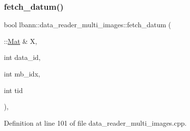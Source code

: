 \subsubsection{\texorpdfstring{fetch\+\_\+datum()}{fetch\_datum()}}
{\footnotesize\ttfamily bool lbann\+::data\+\_\+reader\+\_\+multi\+\_\+images\+::fetch\+\_\+datum (\begin{DoxyParamCaption}\item[{\+::\hyperlink{base_8hpp_a68f11fdc31b62516cb310831bbe54d73}{Mat} \&}]{X,  }\item[{int}]{data\+\_\+id,  }\item[{int}]{mb\+\_\+idx,  }\item[{int}]{tid }\end{DoxyParamCaption})\hspace{0.3cm}{\ttfamily [override]}, {\ttfamily [protected]}}



Definition at line 101 of file data\+\_\+reader\+\_\+multi\+\_\+images.\+cpp.


